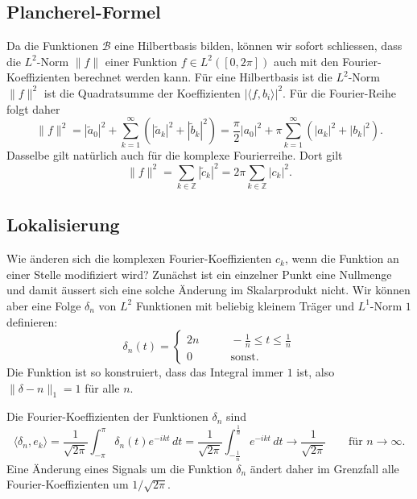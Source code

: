 \subsection{Plancherel-Formel}
Da die Funktionen $\mathcal{B}$ eine Hilbertbasis bilden, können wir sofort
schliessen, dass die $L^2$-Norm $\|f\|$ einer Funktion $f\in L^2([0,2\pi])$
auch mit den Fourier-Koeffizienten berechnet werden kann.
Für eine Hilbertbasis ist die $L^2$-Norm $\|f\|^2$ ist die Quadratsumme
der Koeffizienten $|\langle f,b_i\rangle|^2$.
Für die Fourier-Reihe folgt daher
\[
\| f \|^2
=
|\tilde{a}_0|^2
+
\sum_{k=1}^\infty
(
|\tilde{a}_k|^2
+
|\tilde{b}_k|^2
)
=
\frac{\pi}{2}
|a_0|^2
+
\pi
\sum_{k=1}^\infty
(
|a_k|^2
+
|b_k|^2
).
\]
Dasselbe gilt natürlich auch für die komplexe Fourierreihe.
Dort gilt
\[
\| f\|^2
=
\sum_{k\in\mathbb Z} |\tilde{c}_k|^2
=
2\pi \sum_{k\in\mathbb Z} |c_k|^2.
\]

\subsection{Lokalisierung
\label{fourier:reihen:lokalisierung}}
%
Wie änderen sich die komplexen Fourier-Koeffizienten $c_k$, wenn die
Funktion an einer Stelle modifiziert wird?
Zunächst ist ein einzelner Punkt eine Nullmenge und damit äussert sich
eine solche Änderung im Skalarprodukt nicht.
Wir können aber eine Folge $\delta_n$ von $L^2$ Funktionen mit beliebig
kleinem Träger und $L^1$-Norm $1$ definieren:
\begin{equation}
\delta_n(t) = \begin{cases}
2n&\qquad-\frac1n \le t\le \frac1n\\
0&\qquad\text{sonst.}
\end{cases}
\label{fourier:deltadef}
\end{equation}
Die Funktion ist so konstruiert, dass das Integral immer $1$ ist, also
$\|\delta-n\|_1=1$ für alle $n$.

Die Fourier-Koeffizienten der Funktionen $\delta_n$ sind
\begin{equation}
\langle \delta_n,e_k \rangle
=
\frac{1}{\sqrt{2\pi}}\int_{-\pi}^\pi \delta_n(t) e^{-ik t}\,dt
=
\frac{1}{\sqrt{2\pi}}\int_{-\frac1n}^{\frac1n} e^{-ikt}\,dt
\to
\frac{1}{\sqrt{2\pi}}
\qquad\text{für $n\to\infty$}.
\label{fourier:delta0}
\end{equation}
Eine Änderung eines Signals um die Funktion $\delta_n$ ändert daher im
Grenzfall alle Fourier-Koeffizienten um $1/\sqrt{2\pi}$.

